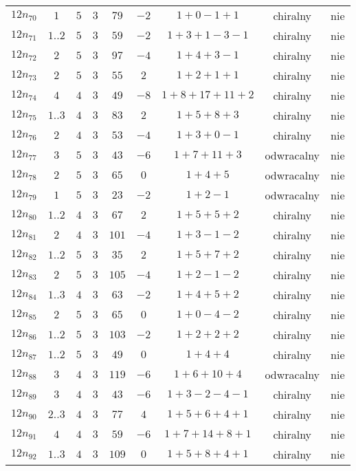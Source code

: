 \begin{longtable}{ccccccccc}
$12n_{70}$ & $1$ & $5$ & $3$ & $79$ & $-2$ & $1+0-1+1$ & chiralny & nie \\
$12n_{71}$ & $1..2$ & $5$ & $3$ & $59$ & $-2$ & $1+3+1-3-1$ & chiralny & nie \\
$12n_{72}$ & $2$ & $5$ & $3$ & $97$ & $-4$ & $1+4+3-1$ & chiralny & nie \\
$12n_{73}$ & $2$ & $5$ & $3$ & $55$ & $2$ & $1+2+1+1$ & chiralny & nie \\
$12n_{74}$ & $4$ & $4$ & $3$ & $49$ & $-8$ & $1+8+17+11+2$ & chiralny & nie \\
$12n_{75}$ & $1..3$ & $4$ & $3$ & $83$ & $2$ & $1+5+8+3$ & chiralny & nie \\
$12n_{76}$ & $2$ & $4$ & $3$ & $53$ & $-4$ & $1+3+0-1$ & chiralny & nie \\
$12n_{77}$ & $3$ & $5$ & $3$ & $43$ & $-6$ & $1+7+11+3$ & odwracalny & nie \\
$12n_{78}$ & $2$ & $5$ & $3$ & $65$ & $0$ & $1+4+5$ & odwracalny & nie \\
$12n_{79}$ & $1$ & $5$ & $3$ & $23$ & $-2$ & $1+2-1$ & odwracalny & nie \\
$12n_{80}$ & $1..2$ & $4$ & $3$ & $67$ & $2$ & $1+5+5+2$ & chiralny & nie \\
$12n_{81}$ & $2$ & $4$ & $3$ & $101$ & $-4$ & $1+3-1-2$ & chiralny & nie \\
$12n_{82}$ & $1..2$ & $5$ & $3$ & $35$ & $2$ & $1+5+7+2$ & chiralny & nie \\
$12n_{83}$ & $2$ & $5$ & $3$ & $105$ & $-4$ & $1+2-1-2$ & chiralny & nie \\
$12n_{84}$ & $1..3$ & $4$ & $3$ & $63$ & $-2$ & $1+4+5+2$ & chiralny & nie \\
$12n_{85}$ & $2$ & $5$ & $3$ & $65$ & $0$ & $1+0-4-2$ & chiralny & nie \\
$12n_{86}$ & $1..2$ & $5$ & $3$ & $103$ & $-2$ & $1+2+2+2$ & chiralny & nie \\
$12n_{87}$ & $1..2$ & $5$ & $3$ & $49$ & $0$ & $1+4+4$ & chiralny & nie \\
$12n_{88}$ & $3$ & $4$ & $3$ & $119$ & $-6$ & $1+6+10+4$ & odwracalny & nie \\
$12n_{89}$ & $3$ & $4$ & $3$ & $43$ & $-6$ & $1+3-2-4-1$ & chiralny & nie \\
$12n_{90}$ & $2..3$ & $4$ & $3$ & $77$ & $4$ & $1+5+6+4+1$ & chiralny & nie \\
$12n_{91}$ & $4$ & $4$ & $3$ & $59$ & $-6$ & $1+7+14+8+1$ & chiralny & nie \\
$12n_{92}$ & $1..3$ & $4$ & $3$ & $109$ & $0$ & $1+5+8+4+1$ & chiralny & nie \\

\end{longtable}
